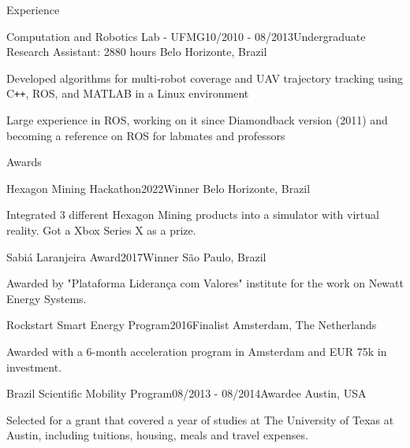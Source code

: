 \documentclass[12pt, a4paper]{resume} %
\begin{document}
\begin{rSection}{Experience}
	\begin{rSubsection}{Computation and Robotics Lab - UFMG}{10/2010 - 08/2013}{\normalfont Undergraduate Research Assistant: 2880 hours}{ \normalfont Belo Horizonte, Brazil}
		\item Developed algorithms for multi-robot coverage and UAV trajectory tracking using C\texttt{++}, ROS, and MATLAB in a Linux environment
		\item Large experience in ROS, working on it since Diamondback version (2011) and becoming a reference on ROS for labmates and professors
	\end{rSubsection}
\end{rSection}




\begin{rSection}{Awards}

	\begin{rSubsection}{Hexagon Mining Hackathon}{2022}{Winner}{ \normalfont Belo Horizonte, Brazil}
		\item Integrated 3 different Hexagon Mining products into a simulator with virtual reality. Got a Xbox Series X as a prize.
	\end{rSubsection}

	\begin{rSubsection}{Sabiá Laranjeira Award}{2017}{Winner}{ \normalfont São Paulo, Brazil}
		\item Awarded by "Plataforma Liderança com Valores" institute for the work on Newatt Energy Systems.
	\end{rSubsection}

	\begin{rSubsection}{Rockstart Smart Energy Program}{2016}{Finalist}{ \normalfont Amsterdam, The Netherlands}
		\item Awarded with a 6-month acceleration program in Amsterdam and EUR 75k in investment.
	\end{rSubsection}

	\begin{rSubsection}{Brazil Scientific Mobility Program}{08/2013 - 08/2014}{Awardee}{ \normalfont Austin, USA}
		\item Selected for a grant that covered a year of studies at The University of Texas at Austin, including tuitions, housing, meals and travel expenses.
	\end{rSubsection}

\end{rSection}
\end{document}
